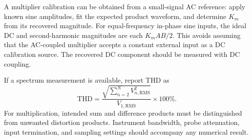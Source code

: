 \documentclass[11pt,a4paper]{article}
\begin{document}
A multiplier calibration can be obtained from a small-signal AC reference: apply known sine amplitudes, fit the expected product waveform, and determine $K_m$ from its recovered magnitude. For equal-frequency in-phase sine inputs, the ideal DC and second-harmonic magnitudes are each $K_mAB/2$. This avoids assuming that the AC-coupled multiplier accepts a constant external input as a DC calibration source. The recovered DC component should be measured with DC coupling.

If a spectrum measurement is available, report THD as
\begin{equation}
\mathrm{THD}=\frac{\sqrt{\sum_{n=2}^{N}V_{n,\mathrm{RMS}}^2}}
{V_{1,\mathrm{RMS}}}\times100\%.
\end{equation}
For multiplication, intended sum and difference products must be distinguished from unwanted distortion products. Instrument bandwidth, probe attenuation, input termination, and sampling settings should accompany any numerical result.
\end{document}
